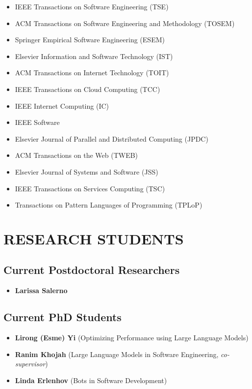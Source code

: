 \documentclass[paper=letter,fontsize=11pt]{scrartcl} %
\newcommand{\NewPart}[2]{\section*{\uppercase{#1} #2}}
\begin{document}
\begin{itemize}
\item IEEE Transactions on Software Engineering (TSE)
\item ACM  Transactions on Software Engineering and Methodology (TOSEM)
\item Springer Empirical Software Engineering (ESEM)
\item Elsevier Information and Software Technology (IST)
\item ACM Transactions on Internet Technology (TOIT)
\item IEEE Transactions on Cloud Computing (TCC)
\item IEEE Internet Computing (IC)
\item IEEE Software
\item Elsevier Journal of Parallel and Distributed Computing (JPDC)
\item ACM Transactions on the Web (TWEB)
\item Elsevier Journal of Systems and Software (JSS)
\item IEEE Transactions on Services Computing (TSC)
\item Transactions on Pattern Languages of Programming (TPLoP)
\end{itemize}

\NewPart{Research Students}{}

\subsection*{Current Postdoctoral Researchers}

\begin{itemize}
\item \textbf{Larissa Salerno}
\end{itemize}

\subsection*{Current PhD Students}

\begin{itemize}
\item \textbf{Lirong (Esme) Yi} (Optimizing Performance using Large Language Models)
\item \textbf{Ranim Khojah} (Large Language Models in Software Engineering, \emph{co-supervisor})
\item \textbf{Linda Erlenhov}  (Bots in Software Development)
\end{itemize}
\end{document}
